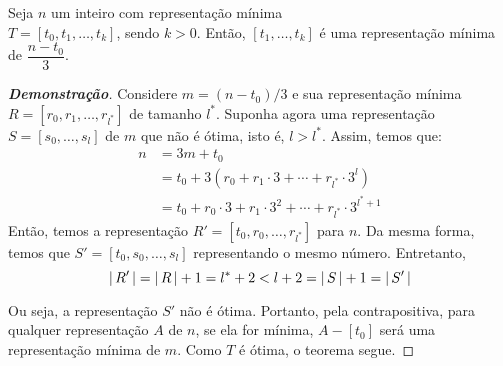 \begin{theorem}
    Seja $n$ um inteiro com representação mínima \\$T = [t_0, t_1, \ldots, t_k]$, sendo $k > 0$. Então, $[t_1, \ldots, t_k]$ é uma representação mínima de $\dfrac{n - t_0}{3}$.
\end{theorem}

\begin{proof}[\textbf{Demonstração}]
    Considere $m = (n - t_0) / 3$ e sua representação mínima $R = [r_0, r_1, \ldots, r_{l^*}]$ de tamanho $l^*$. Suponha agora uma representação $S = [s_0, \ldots, s_l]$ de $m$ que não é ótima, isto é, $l > l^*$. Assim, temos que:
    \begin{align*}
        n &= 3 m + t_0 \\
        &= t_0 + 3 \left(r_0 + r_1 \cdot 3 + \cdots + r_{l^*} \cdot 3^l\right) \\
        &= t_0 + r_0 \cdot 3 + r_1 \cdot 3^2 + \cdots + r_{l^*} \cdot 3^{l^*+1}
    \end{align*}
    Então, temos a representação $R' = [t_0, r_0, \ldots, r_{l^*}]$ para $n$. Da mesma forma, temos que $S' = [t_0, s_0, \ldots, s_l]$ representando o mesmo número. Entretanto,
    \[
        {\lvert\,R'\,\rvert} = {\lvert\,R\,\rvert} + 1 = l^* + 2 < l + 2 = {\lvert\,S\,\rvert} + 1 = {\lvert\,S'\,\rvert}
    \]

    Ou seja, a representação $S'$ não é ótima. Portanto, pela contrapositiva, para qualquer representação $A$ de $n$, se ela for mínima, $A - [t_0]$ será uma representação mínima de $m$. Como $T$ é ótima, o teorema segue.
\end{proof}




